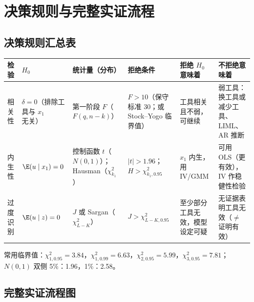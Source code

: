 \section{决策规则与完整实证流程}\label{sec:U09-workflow}

\subsection{决策规则汇总表}

\begin{center}
\footnotesize
\setlength{\tabcolsep}{3pt}
\begin{tabularx}{\linewidth}{>{\raggedright\arraybackslash}p{1.3cm}>{\raggedright\arraybackslash}p{1.9cm}>{\raggedright\arraybackslash}p{2.6cm}LLL}
\toprule
检验 & $H_0$ & 统计量（分布） & 拒绝条件 & 拒绝 $H_0$ 意味着 & 不拒绝意味着\\
\midrule
相关性 & $\delta=0$（排除工具与 $x_1$ 无关） & 第一阶段 $F$（$F(q,n-k)$） & $F>10$（保守标准 30；或 Stock--Yogo 临界值） & 工具相关且不弱，可继续 & 弱工具：换工具或减少工具、LIML、AR 推断\\
内生性 & $\E(u\mid x_1)=0$ & 控制函数 $t$（$N(0,1)$）；Hausman（$\chi^2_{k_1}$） & $|t|>1.96$；$H>\chi^2_{k_1,0.95}$ & $x_1$ 内生，用 IV/GMM & 可用 OLS（更有效），IV 作稳健性检验\\
过度识别 & $\E(u\mid z)=0$ & $J$ 或 Sargan（$\chi^2_{L-K}$） & $J>\chi^2_{L-K,0.95}$ & 至少部分工具无效，模型设定可疑 & 无证据表明工具无效（$\neq$ 证明有效）\\
\bottomrule
\end{tabularx}
\label{tab:U09-rules}
\end{center}
常用临界值：$\chi^2_{1,0.95}=3.84$，$\chi^2_{1,0.99}=6.63$，$\chi^2_{2,0.95}=5.99$，$\chi^2_{3,0.95}=7.81$；$N(0,1)$ 双侧 5\%：1.96，1\%：2.58。

\subsection{完整实证流程图}

